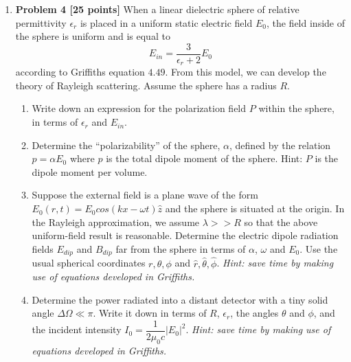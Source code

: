 \documentclass[fleqn]{article}
\begin{document}
\begin{enumerate}
    \pagebreak




    \item \textbf{Problem 4 [25 points]}
    When a linear dielectric sphere of relative permittivity $\epsilon_r$ is placed in a uniform static electric 
    field $E_0$, the field inside of the sphere is uniform and is equal to
    $$
      E_{in}=\dfrac{3}{\epsilon_r+2} E_0
    $$
    according to Griffiths equation $4.49$. From this model, we can develop the theory of Rayleigh scattering.
    Assume the sphere has a radius $R$.
    \begin{enumerate}
      \item Write down an expression for the polarization field $P$ within the sphere, in terms of 
      $\epsilon_r$ and $E_{in}$.

      \item Determine the “polarizability” of the sphere, $\alpha$, defined by the relation $p=\alpha E_0$ 
      where $p$ is the total dipole moment of the sphere. Hint: $P$ is the dipole moment per volume.

      \item Suppose the external field is a plane wave of the form $E_0(r,t)=E_0 cos(kx-\omega t) \hat{z}$ and the
      sphere is situated at the origin. In the Rayleigh approximation, we assume $\lambda >> R$ so that the
      above uniform-field result is reasonable. Determine the electric dipole radiation fields $E_{dip}$ and
      $B_{dip}$ far from the sphere in terms of $\alpha$, $\omega$ and $E_0$. Use the usual spherical coordinates 
      $r, \theta, \phi$ and $\hat{r}, \hat{\theta}, \hat{\phi}$. 
      \emph{Hint: save time by making use of equations developed in Griffiths.}


      \item Determine the power radiated into a distant detector with a tiny solid angle $\Delta \Omega ≪ \pi$. 
      Write it down in terms of $R$, $\epsilon_r$, the angles $\theta$ and $\phi$, and the incident intensity 
      $I_0=\dfrac{1}{2 \mu_0 c}|E_0|^2$. \emph{Hint: save time by making use of equations developed in Griffiths.}
    \end{enumerate}
    
    \pagebreak

  \end{enumerate}
\end{document}
